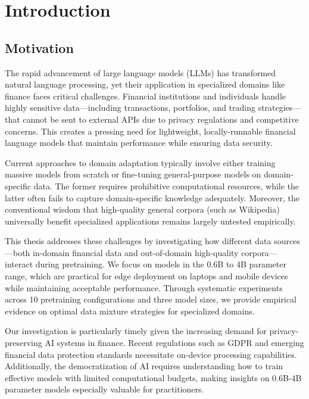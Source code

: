 \chapter{Introduction}

\section{Motivation}

The rapid advancement of large language models (LLMs) has transformed natural language processing, yet their application in specialized domains like finance faces critical challenges. Financial institutions and individuals handle highly sensitive data—including transactions, portfolios, and trading strategies—that cannot be sent to external APIs due to privacy regulations and competitive concerns. This creates a pressing need for lightweight, locally-runnable financial language models that maintain performance while ensuring data security.

Current approaches to domain adaptation typically involve either training massive models from scratch or fine-tuning general-purpose models on domain-specific data. The former requires prohibitive computational resources, while the latter often fails to capture domain-specific knowledge adequately. Moreover, the conventional wisdom that high-quality general corpora (such as Wikipedia) universally benefit specialized applications remains largely untested empirically.

This thesis addresses these challenges by investigating how different data sources—both in-domain financial data and out-of-domain high-quality corpora—interact during pretraining. We focus on models in the 0.6B to 4B parameter range, which are practical for edge deployment on laptops and mobile devices while maintaining acceptable performance. Through systematic experiments across 10 pretraining configurations and three model sizes, we provide empirical evidence on optimal data mixture strategies for specialized domains.

Our investigation is particularly timely given the increasing demand for privacy-preserving AI systems in finance. Recent regulations such as GDPR and emerging financial data protection standards necessitate on-device processing capabilities. Additionally, the democratization of AI requires understanding how to train effective models with limited computational budgets, making insights on 0.6B-4B parameter models especially valuable for practitioners.

